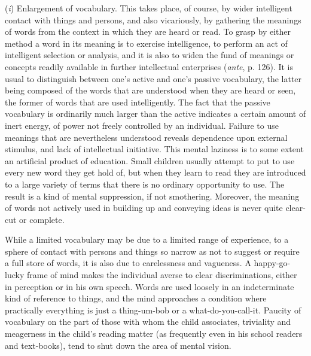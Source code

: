 \documentclass[letterpaper]{book}
\begin{document}

(\emph{i}) Enlargement of vocabulary. This takes place, of course, by
wider intelligent contact with things and persons, and also vicariously,
by gathering the meanings of words from the context in which they are
heard or read. To grasp by either method a word in its meaning is to
exercise intelligence, to perform an act of intelligent selection or
analysis, and it is also to widen the fund of meanings or concepts
readily available in further intellectual enterprises (\emph{ante}, p.
126). It is usual to distinguish between one's active and one's passive
vocabulary, the latter being composed of the words that are understood
when they are heard or seen, the former of words that are used
intelligently. The fact that the passive vocabulary is ordinarily much
larger than the active indicates a certain amount of inert energy, of
power not freely controlled by an individual. Failure to use meanings
that are nevertheless understood reveals dependence upon external
stimulus, and lack of intellectual initiative. This mental laziness is
to some extent an artificial product of education. Small children
usually attempt to put to use every new word they get hold of, but when
they learn to read they are introduced to a large variety of terms that
there is no ordinary opportunity to
use.
The result is a kind of mental suppression, if not smothering. Moreover,
the meaning of words not actively used in building up and conveying
ideas is never quite clear-cut or complete.


While a limited vocabulary may be due to a limited range of experience,
to a sphere of contact with persons and things so narrow as not to
suggest or require a full store of words, it is also due to carelessness
and vagueness. A happy-go-lucky frame of mind makes the individual
averse to clear discriminations, either in perception or in his own
speech. Words are used loosely in an indeterminate kind of reference to
things, and the mind approaches a condition where practically everything
is just a thing-um-bob or a what-do-you-call-it. Paucity of vocabulary
on the part of those with whom the child associates, triviality and
meagerness in the child's reading matter (as frequently even in his
school readers and text-books), tend to shut down the area of mental
vision.

\end{document}
